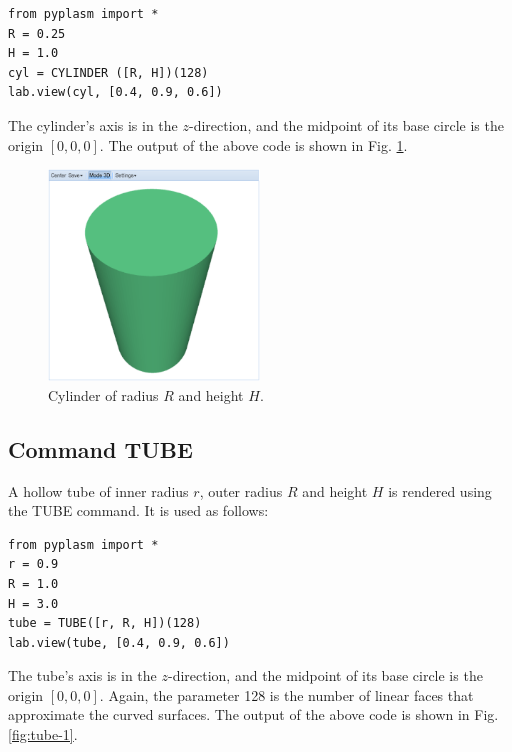 \documentclass{article}
\begin{document}
\begin{verbatim}
from pyplasm import *
R = 0.25
H = 1.0
cyl = CYLINDER ([R, H])(128)
lab.view(cyl, [0.4, 0.9, 0.6])
\end{verbatim}
The cylinder's axis is in the $z$-direction, and the midpoint of
its base circle is the origin $[0, 0, 0]$. 
The output of the above code is shown in Fig. \ref{fig:cyl-1}.

\begin{figure}[!ht]
\begin{center}
\includegraphics[width=0.5\textwidth]{img/cyl-1.png}
\end{center}
\vspace{-2mm}
\caption{Cylinder of radius $R$ and height $H$.}
\label{fig:cyl-1}
\end{figure}

\subsection{Command TUBE}

A hollow tube of inner radius $r$, outer radius $R$ and height
$H$ is rendered using the TUBE command. It is used as follows:
\begin{verbatim}
from pyplasm import *
r = 0.9
R = 1.0
H = 3.0
tube = TUBE([r, R, H])(128)
lab.view(tube, [0.4, 0.9, 0.6])
\end{verbatim}
The tube's axis is in the $z$-direction, and the midpoint of
its base circle is the origin $[0, 0, 0]$. Again, the parameter
128 is the number of linear faces that approximate the 
curved surfaces. The output of the above code is shown in Fig. \ref{fig:tube-1}.

\newpage
\end{document}
